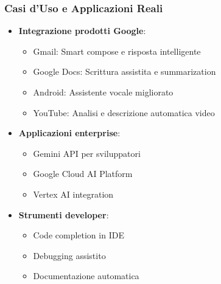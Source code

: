 \documentclass[aspectratio=169]{beamer}
\begin{document}
%
%
\begin{frame}
\frametitle{Casi d'Uso e Applicazioni Reali}
\begin{itemize}
    \item \textbf{Integrazione prodotti Google}:
    \begin{itemize}
        \item Gmail: Smart compose e risposta intelligente
        \item Google Docs: Scrittura assistita e summarization
        \item Android: Assistente vocale migliorato
        \item YouTube: Analisi e descrizione automatica video
    \end{itemize}
    \item \textbf{Applicazioni enterprise}:
    \begin{itemize}
        \item Gemini API per sviluppatori
        \item Google Cloud AI Platform
        \item Vertex AI integration
    \end{itemize}
    \item \textbf{Strumenti developer}:
    \begin{itemize}
        \item Code completion in IDE
        \item Debugging assistito
        \item Documentazione automatica
    \end{itemize}
\end{itemize}
\end{frame}
%
%
\end{document}

